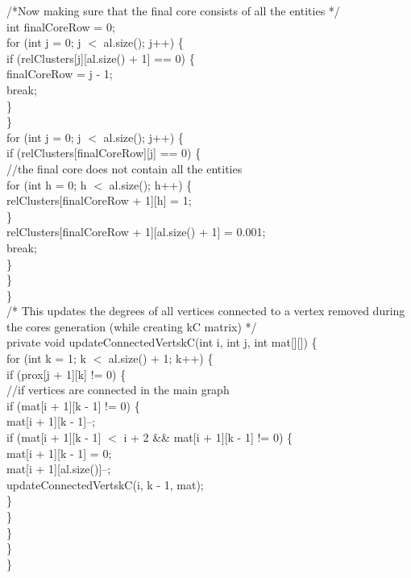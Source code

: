 \begin{ttfamily   }
\begin{scriptsize}
	\noindent /*Now making sure that the final core consists of all the entities
         */\\
        int finalCoreRow = 0;\\
        \noindent for (int j = 0;   j $<$ al.size();   j++) \{\\
            if (relClusters[j][al.size() + 1] == 0) \{\\
                finalCoreRow = j - 1;\\
                break;\\
            \}\\
        \}\\
        \noindent for (int j = 0;   j $<$ al.size();   j++) \{\\
            if (relClusters[finalCoreRow][j] == 0) \{\\\noindent//the final core does not contain all the entities\\
                \noindent for (int h = 0; h $<$ al.size(); h++) \{\\
                    relClusters[finalCoreRow + 1][h] = 1;\\
                \}\\
                relClusters[finalCoreRow + 1][al.size() + 1] = 0.001;\\
                break;\\
            \}\\
        \}\\        
    \}\\

    \noindent /*
      This updates the degrees of all vertices connected
      to a vertex removed during the cores generation (while
      creating kC matrix)
     */\\
    private void updateConnectedVertskC(int i, int j, int mat[][]) \{\\
        \noindent for (int k = 1;   k $<$ al.size() + 1;   k++) \{\\
            if (prox[j + 1][k] != 0) \{\\\noindent//if vertices are connected in the main graph\\
                if (mat[i + 1][k - 1] != 0) \{\\
                    mat[i + 1][k - 1]--;\\
                    if (mat[i + 1][k - 1] $<$ i + 2 \&\& mat[i + 1][k - 1] != 0) \{\\
                        mat[i + 1][k - 1] = 0;\\
                        mat[i + 1][al.size()]--;\\
                        updateConnectedVertskC(i, k - 1, mat);\\
                    \}\\
                \}\\
            \}\\
        \}\\
    \}\\


\end{scriptsize}
\end{ttfamily   }
